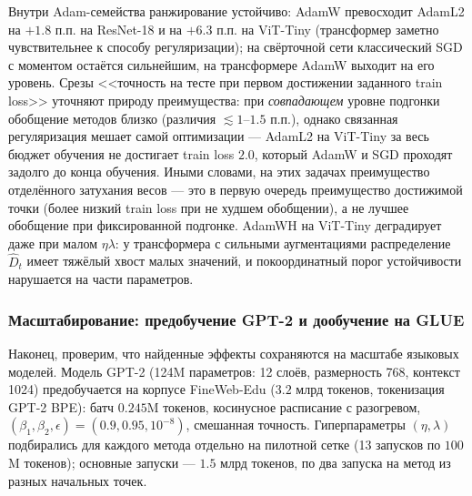 Внутри Adam-семейства ранжирование устойчиво: AdamW превосходит AdamL2 на $+1.8$ п.п. на ResNet-18 и на $+6.3$ п.п. на ViT-Tiny (трансформер заметно чувствительнее к способу регуляризации); на свёрточной сети классический SGD с моментом остаётся сильнейшим, на трансформере AdamW выходит на его уровень. Срезы <<точность на тесте при первом достижении заданного train loss>> уточняют природу преимущества: при \emph{совпадающем} уровне подгонки обобщение методов близко (различия $\lesssim 1$--$1.5$ п.п.), однако связанная регуляризация мешает самой оптимизации --- AdamL2 на ViT-Tiny за весь бюджет обучения не достигает train loss $2.0$, который AdamW и SGD проходят задолго до конца обучения. Иными словами, на этих задачах преимущество отделённого затухания весов --- это в первую очередь преимущество достижимой точки (более низкий train loss при не худшем обобщении), а не лучшее обобщение при фиксированной подгонке. AdamWH на ViT-Tiny деградирует даже при малом $\eta\lambda$: у трансформера с сильными аугментациями распределение $\hat D_t$ имеет тяжёлый хвост малых значений, и покоординатный порог устойчивости нарушается на части параметров.

\subsubsection{Масштабирование: предобучение GPT-2 и дообучение на GLUE}

Наконец, проверим, что найденные эффекты сохраняются на масштабе языковых моделей. Модель GPT-2 (124M параметров: 12 слоёв, размерность 768, контекст 1024) предобучается на корпусе FineWeb-Edu ($3.2$ млрд токенов, токенизация GPT-2 BPE): батч $0.245$M токенов, косинусное расписание с разогревом, $(\beta_1, \beta_2, \epsilon) = (0.9, 0.95, 10^{-8})$, смешанная точность. Гиперпараметры $(\eta, \lambda)$ подбирались для каждого метода отдельно на пилотной сетке (13 запусков по $100$M токенов); основные запуски --- $1.5$ млрд токенов, по два запуска на метод из разных начальных точек.

